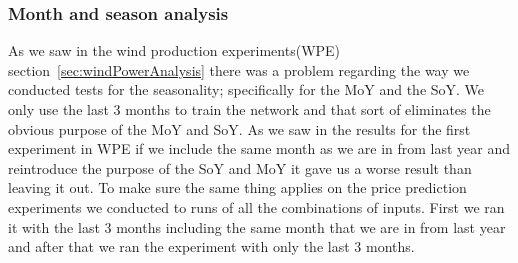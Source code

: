 \subsubsection{Month and season analysis}
\begin{table}[H]
\centering  %
\caption{Top20(3 months) compared to 4 months run.} %
\label{table:top20comparedTo4months} %
\end{table}

As we saw in the wind production experiments(WPE) section~\ref{sec:windPowerAnalysis} there was a problem regarding the way we conducted tests for the seasonality; specifically for the MoY and the SoY. We only use the last 3 months to train the network and that sort of eliminates the obvious purpose of the MoY and SoY. As we saw in the results for the first experiment in WPE if we include the same month as we are in from last year and reintroduce the purpose of the SoY and MoY it gave us a worse result than leaving it out. To make sure the same thing applies on the price prediction experiments we conducted to runs of all the combinations of inputs. First we ran it with the last 3 months including the same month that we are in from last year and after that we ran the experiment with only the last 3 months.

